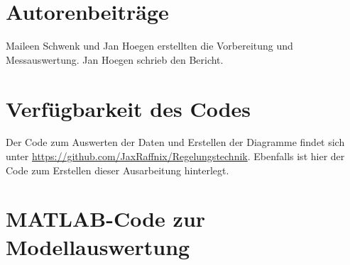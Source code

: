 \documentclass[
    paper=a4,
    fontsize=10pt,
    DIV=12,
    oneside,
]{scrartcl}
\begin{document}
\printbibliography[heading=bibnumbered]

\section{Autorenbeiträge}
    Maileen Schwenk und Jan Hoegen erstellten die Vorbereitung und Messauswertung. Jan Hoegen schrieb den Bericht.

\section{Verfügbarkeit des Codes}
    Der Code zum Auswerten der Daten und Erstellen der Diagramme findet sich unter \url{https://github.com/JaxRaffnix/Regelungstechnik}. Ebenfalls ist hier der Code zum Erstellen dieser Ausarbeitung hinterlegt.

\appendix   

\section{MATLAB-Code zur Modellauswertung}
    
    
    
    
    
    
\end{document}
